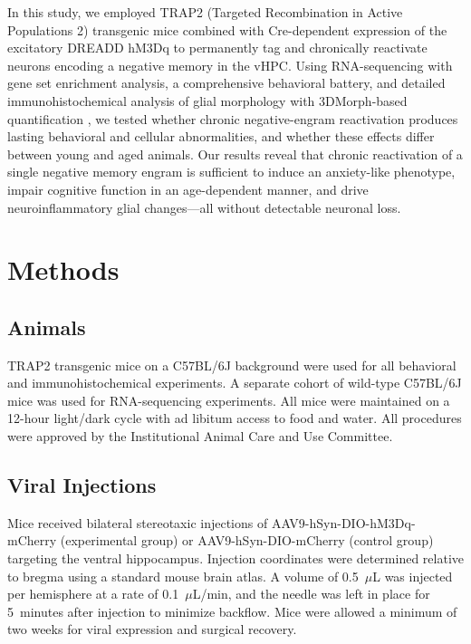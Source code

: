 \documentclass[11pt]{article}
\begin{document}
In this study, we employed TRAP2 (Targeted Recombination in Active Populations 2) transgenic mice \citep{allen2017trap2} combined with Cre-dependent expression of the excitatory DREADD hM3Dq \citep{armbruster2007evolving} to permanently tag and chronically reactivate neurons encoding a negative memory in the vHPC. Using RNA-sequencing with gene set enrichment analysis, a comprehensive behavioral battery, and detailed immunohistochemical analysis of glial morphology with 3DMorph-based quantification \citep{york2018microglia}, we tested whether chronic negative-engram reactivation produces lasting behavioral and cellular abnormalities, and whether these effects differ between young and aged animals. Our results reveal that chronic reactivation of a single negative memory engram is sufficient to induce an anxiety-like phenotype, impair cognitive function in an age-dependent manner, and drive neuroinflammatory glial changes---all without detectable neuronal loss.

\section{Methods}

\subsection{Animals}

TRAP2 transgenic mice on a C57BL/6J background were used for all behavioral and immunohistochemical experiments. A separate cohort of wild-type C57BL/6J mice was used for RNA-sequencing experiments. All mice were maintained on a 12-hour light/dark cycle with ad libitum access to food and water. All procedures were approved by the Institutional Animal Care and Use Committee.

\subsection{Viral Injections}

Mice received bilateral stereotaxic injections of AAV9-hSyn-DIO-hM3Dq-mCherry (experimental group) or AAV9-hSyn-DIO-mCherry (control group) targeting the ventral hippocampus. Injection coordinates were determined relative to bregma using a standard mouse brain atlas. A volume of 0.5~$\mu$L was injected per hemisphere at a rate of 0.1~$\mu$L/min, and the needle was left in place for 5~minutes after injection to minimize backflow. Mice were allowed a minimum of two weeks for viral expression and surgical recovery.
\end{document}
